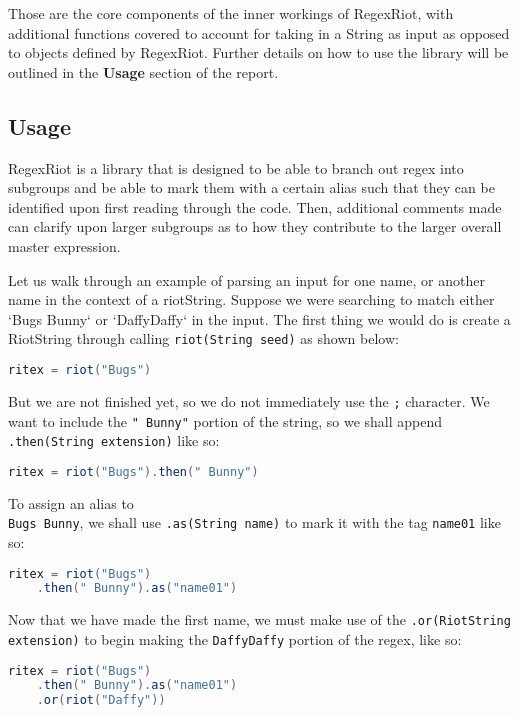\documentclass[conference]{IEEEtran}
\begin{document}
Those are the core components of the inner workings of RegexRiot,
with additional functions covered to account for taking in a String
as input as opposed to objects defined by RegexRiot.
Further details on how to use the library will be outlined in
the \textbf{Usage} section of the report.

\subsection{Usage}
RegexRiot is a library that is designed to be able to branch out regex into
subgroups and be able to mark them with a certain alias such that they can
be identified upon first reading through the code. Then, additional
comments made can clarify upon larger subgroups as to how they
contribute to the larger overall master expression.

Let us walk through an example of parsing an input for one name,
or another name in the context of a riotString.
Suppose we were searching to match either `Bugs Bunny`
or `DaffyDaffy` in the input. The first thing we would do is
create a RiotString through calling \texttt{riot(String seed)} as shown below:

\begin{lstlisting}[language=Java]
ritex = riot("Bugs")
\end{lstlisting}

But we are not finished yet, so we do not immediately use the \texttt{;}
character. We want to include the \texttt{" Bunny"} portion of the string,
so we shall append \\
\texttt{.then(String extension)} like so:

\begin{lstlisting}[language=Java]
ritex = riot("Bugs").then(" Bunny")
\end{lstlisting}

To assign an alias to \\
\texttt{Bugs Bunny}, we shall use \texttt{.as(String name)}
to mark it with the tag \texttt{name01} like so:

\begin{lstlisting}[language=Java]
ritex = riot("Bugs")
    .then(" Bunny").as("name01")
\end{lstlisting}

Now that we have made the first name, we must make use of the
\texttt{.or(RiotString extension)} to begin making the \texttt{DaffyDaffy}
portion of the regex, like so:

\begin{lstlisting}[language=Java]
ritex = riot("Bugs")
    .then(" Bunny").as("name01")
    .or(riot("Daffy"))
\end{lstlisting}
\end{document}
